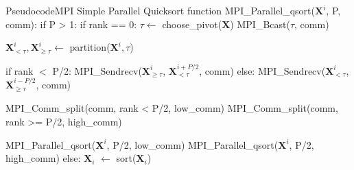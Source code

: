 \documentclass[../main.tex]{subfiles}
\begin{document}
\begin{codeblock}
\begin{code}{Pseudocode}{MPI Simple Parallel Quicksort}
function MPI_Parallel_qsort($\mathbf{X}^i$, P, comm):
    if P > 1:
        if rank == 0:
            $\tau \leftarrow$ choose_pivot($\mathbf{X}$)
            MPI_Bcast($\tau$, comm)

        $\mathbf{X}^{i}_{< \tau}, \mathbf{X}^{i}_{\geq \tau} \leftarrow$ partition($\mathbf{X}^{i}, \tau$)

        if rank $<$ P/2:
            MPI_Sendrecv($\mathbf{X}^{i}_{\geq \tau}$, $\mathbf{X}^{i+P/2}_{< \tau}$, comm)
        else:
            MPI_Sendrecv($\mathbf{X}^{i}_{< \tau}$, $\mathbf{X}^{i-P/2}_{\geq \tau}$, comm)

        MPI_Comm_split(comm, rank < P/2, low_comm)
        MPI_Comm_split(comm, rank >= P/2, high_comm)

        MPI_Parallel_qsort($\mathbf{X}^i$, P/2, low_comm)
        MPI_Parallel_qsort($\mathbf{X}^i$, P/2, high_comm)
    else:
        $\mathbf{X}_i$ $\leftarrow$ sort($\mathbf{X}_i$)

\end{code}
\caption{Pseudocode for the MPI implemetation of the Simple Parallel Quicksort algorithm.}
\label{code:mpi_simple}
\end{codeblock}
\end{document}
